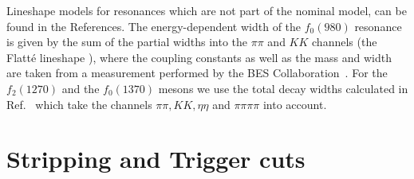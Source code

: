 Lineshape models for resonances which are not part of the nominal model, can be found in the References.
The energy-dependent width of the $f_{0}(980)$ resonance is given by the sum of the partial widths into the $\pi\pi$ and $KK$ channels (\ie the Flatt\'{e} lineshape \cite{Flatte}),
where the coupling constants %
as well as the mass and width are taken from a measurement performed by the BES Collaboration~\cite{Flatte2}.
For the $f_{2}(1270)$ and the $f_{0}(1370)$ mesons we use the total decay widths
calculated in Ref.~\cite{dArgent:2017gzv} which take the channels $\pi  \pi, K  K, \eta  \eta$ and $\pi \pi \pi \pi$ into account. 	



\clearpage
\section{Stripping and Trigger cuts}
\label{sec:StripAndTrigger}

\setcounter{figure}{0}
\setcounter{table}{0}
\renewcommand{\thefigure}{A.\arabic{figure}}
\renewcommand{\thetable}{A.\arabic{table}}

